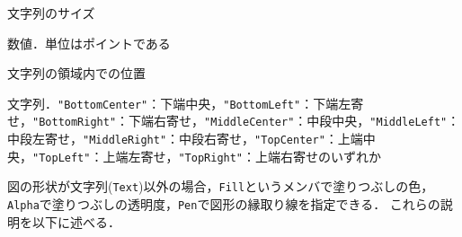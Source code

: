 \begin{description}
\begin{description}
\begin{description}
{\begin{description}
            \end{description}
        }{\nopagebreak
        \item[\texttt{Size}]  \mbox{}
            \vspace{-0.25zw}
            \begin{description}
            \setlength{\itemsep}{-1.5\itemsep}
            \item[説明] 文字列のサイズ
            \item[値] 数値．単位はポイントである
            \end{description}
        }{\nopagebreak
        \item[\texttt{Align}]  \mbox{}
            \vspace{-0.25zw}
            \begin{description}
            \setlength{\itemsep}{-1.5\itemsep}
            \item[説明] 文字列の領域内での位置
            \item[値] 文字列．{\tt "BottomCenter"}：下端中央，{\tt "BottomLeft"}：下端左寄せ，{\tt "BottomRight"}：下端右寄せ，{\tt "MiddleCenter"}：中段中央，{\tt "MiddleLeft"}：中段左寄せ，{\tt "MiddleRight"}：中段右寄せ，{\tt "TopCenter"}：上端中央，{\tt "TopLeft"}：上端左寄せ，{\tt "TopRight"}：上端右寄せのいずれか
            \end{description}
        }
        \end{description}
    \end{description}
\end{description}

図の形状が文字列({\tt Text})以外の場合，{\tt Fill}というメンバで塗りつぶしの色，{\tt Alpha}で塗りつぶしの透明度，{\tt Pen}で図形の縁取り線を指定できる．
これらの説明を以下に述べる．

